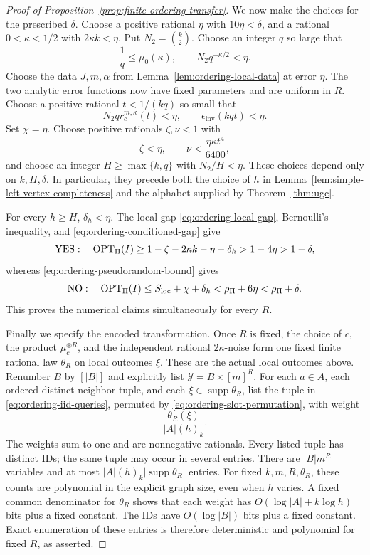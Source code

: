 \begin{proof}[Proof of Proposition~\ref{prop:finite-ordering-transfer}]
We now make the choices for the prescribed \(\delta\).  Choose a
positive rational \(\eta\) with \(10\eta<\delta\), and a rational
\(0<\kappa<1/2\) with \(2\kappa k<\eta\).  Put \(N_2=\binom{k}{2}\).
Choose an integer \(q\) so large that
\[
 \frac1q\le\mu_0(\kappa),\qquad N_2q^{-\kappa/2}<\eta.
\]
Choose the data \(J,m,\alpha\) from
Lemma~\ref{lem:ordering-local-data} at error \(\eta\).  The two
analytic error functions now have fixed parameters and are uniform
in \(R\).  Choose a positive rational \(t<1/(kq)\) so small that
\[
 N_2q r_c^{m,\kappa}(t)<\eta,\qquad \epsilon_{\mathrm{inv}}(kqt)<\eta.
\]
Set \(\chi=\eta\).  Choose positive rationals \(\zeta,\nu<1\) with
\[
 \zeta<\eta,\qquad
 \nu<\frac{\eta\kappa t^4}{6400},
\]
and choose an integer \(H\ge\max\{k,q\}\) with \(N_2/H<\eta\).
These choices depend only on \(k,\Pi,\delta\).  In particular, they
precede both the choice of \(h\) in
Lemma~\ref{lem:simple-left-vertex-completeness} and the alphabet supplied by
Theorem~\ref{thm:ugc}.

For every \(h\ge H\), \(\delta_h<\eta\).  The local gap
\eqref{eq:ordering-local-gap}, Bernoulli's inequality, and
\eqref{eq:ordering-conditioned-gap} give
\[
 \mathrm{YES}:\quad
 \operatorname{OPT}_\Pi(I)\ge1-\zeta-2\kappa k-\eta-\delta_h
 >1-4\eta>1-\delta,
\]
whereas \eqref{eq:ordering-pseudorandom-bound} gives
\[
 \mathrm{NO}:\quad
 \operatorname{OPT}_\Pi(I)\le S_{\mathrm{loc}}+\chi+\delta_h
 <\rho_\Pi+6\eta<\rho_\Pi+\delta.
\]
This proves the numerical claims simultaneously for every \(R\).

Finally we specify the encoded transformation.  Once \(R\) is fixed,
the choice of \(c\), the product \(\mu_c^{\otimes R}\), and the
independent rational \(2\kappa\)-noise form one fixed finite rational
law \(\theta_R\) on local outcomes \(\xi\).  These are the actual
local outcomes above.  Renumber \(B\) by
\([|B|]\) and explicitly list \(\mathcal Y=B\times[m]^R\).
For each \(a\in A\), each ordered
distinct neighbor tuple, and each \(\xi\in\operatorname{supp}\theta_R\),
list the tuple in \eqref{eq:ordering-iid-queries}, permuted by
\eqref{eq:ordering-slot-permutation}, with weight
\begin{equation}
 \frac{\theta_R(\xi)}{|A|(h)_k}.
\label{eq:ordering-rational-weight}
\end{equation}
The weights sum to one and are nonnegative rationals.  Every listed
tuple has distinct IDs; the same tuple may occur in several entries.
There are \(|B|m^R\) variables and at most
\(|A|(h)_k|\operatorname{supp}\theta_R|\) entries.  For fixed
\(k,m,R,\theta_R\), these counts are polynomial in the explicit graph
size, even when \(h\) varies.  A fixed common denominator for
\(\theta_R\) shows that each weight has
\(O(\log|A|+k\log h)\) bits plus a fixed constant.  The IDs have
\(O(\log|B|)\) bits plus a fixed constant.  Exact enumeration of
these entries is therefore deterministic and polynomial for fixed
\(R\), as asserted.
\end{proof}


